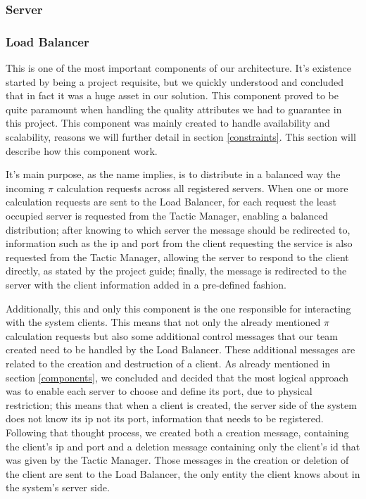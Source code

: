 \documentclass[12pt]{article}
\begin{document}
\subsubsection{Server}


\subsubsection{Load Balancer} \label{lb}
This is one of the most important components of our architecture. It's existence started by being a project requisite, but we quickly understood and concluded that in fact it was a huge asset in our solution. This component proved to be quite paramount when handling the quality attributes we had to guarantee in this project. This component was mainly created to handle availability and scalability, reasons we will further detail in section \ref{constraints}. This section will describe how this component work.

It's main purpose, as the name implies, is to distribute in a balanced way the incoming $\pi$ calculation requests across all registered servers. When one or more calculation requests are sent to the Load Balancer, for each request the least occupied server is requested from the Tactic Manager, enabling a balanced distribution; after knowing to which server the message should be redirected to, information such as the ip and port from the client requesting the service is also requested from the Tactic Manager, allowing the server to respond to the client directly, as stated by the project guide; finally, the message is redirected to the server with the client information added in a pre-defined fashion.

Additionally, this and only this component is the one responsible for interacting with the system clients. This means that not only the already mentioned $\pi$ calculation requests but also some additional control messages that our team created need to be handled by the Load Balancer. These additional messages are related to the creation and destruction of a client. As already mentioned in section \ref{components}, we concluded and decided that the most logical approach was to enable each server to choose and define its port, due to physical restriction; this means that when a client is created, the server side of the system does not know its ip not its port, information that needs to be registered. Following that thought process, we created both a creation message, containing the client's ip and port and a deletion message containing only the client's id that was given by the Tactic Manager. Those messages in the creation or deletion of the client are sent to the Load Balancer, the only entity the client knows about in the system's server side.
\end{document}
